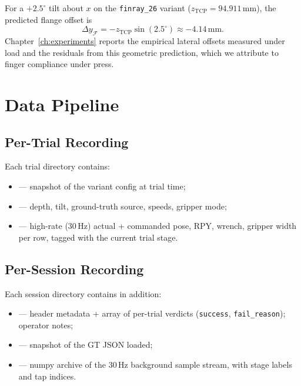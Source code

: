 For a $+2.5^{\circ}$ tilt about $x$ on the \texttt{finray\_26} variant
($z_{\text{TCP}} = 94.911$\,mm), the predicted flange offset is
\begin{equation}
  \Delta y_\mathcal{F} = -z_{\text{TCP}}\sin(2.5^{\circ})
                       \approx -4.14\,\mathrm{mm}.
\end{equation}
Chapter~\ref{ch:experiments} reports the empirical lateral offsets measured under
load and the residuals from this geometric prediction, which we attribute to
finger compliance under press.

\section{Data Pipeline}

\subsection{Per-Trial Recording}

Each trial directory  contains:
\begin{itemize}
  \item {} --- snapshot of the variant config at trial time;
  \item {} --- depth, tilt, ground-truth source,
        speeds, gripper mode;
  \item {} --- high-rate (30\,Hz) actual + commanded
        pose, RPY, wrench, gripper width per row, tagged with the current
        trial stage.
\end{itemize}

\subsection{Per-Session Recording}

Each session directory  contains in addition:
\begin{itemize}
  \item {} --- header metadata + array of per-trial
        verdicts (\texttt{success}, \texttt{fail\_reason}); operator notes;
  \item {} --- snapshot of the GT JSON loaded;
  \item {} --- numpy archive of the 30\,Hz background
        sample stream, with stage labels and tap indices.
\end{itemize}

